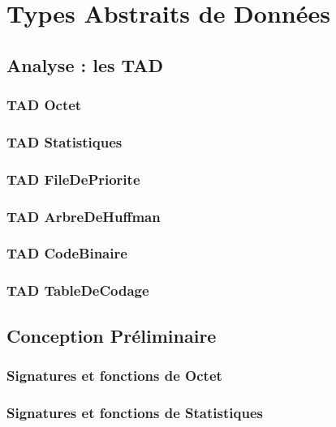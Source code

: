 \documentclass[10pt]{report}
\begin{document}
    \chapter{Types Abstraits de Données}

        \section{Analyse : les TAD}
            \subsection{TAD Octet}
                
            \subsection{TAD Statistiques}
                
            \subsection{TAD FileDePriorite}
                
            \subsection{TAD ArbreDeHuffman}
                
            \subsection{TAD CodeBinaire}
                
            \subsection{TAD TableDeCodage}
                

        \newpage
        \section{Conception Préliminaire}
            \subsection{Signatures et fonctions de Octet}
                
            \subsection{Signatures et fonctions de Statistiques}
                
\end{document}
